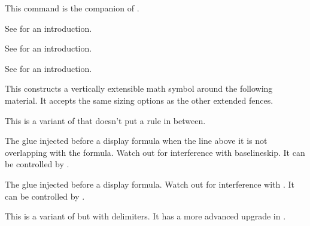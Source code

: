 \stopnewprimitive

\startnewprimitive[title={\prm {Ustopmathmode}}]

This command is the companion of .

\stopnewprimitive

\startnewprimitive[title={\prm {Ustretched}}]

See  for an introduction.

\stopnewprimitive

\startnewprimitive[title={\prm {Ustretchedwithdelims}}]

See  for an introduction.

\stopnewprimitive

\startnewprimitive[title={\prm {Uunderdelimiter}}]

See  for an introduction.

\stopnewprimitive

\startnewprimitive[title={\prm {Uvextensible}}]

This constructs a vertically extensible math symbol around the following
material. It accepts the same sizing options as the other extended fences.

\stopnewprimitive

\startoldprimitive[title={\prm {above}}][obsolete=yes]

This is a variant of  that doesn't put a rule in between.

\stopoldprimitive

\startoldprimitive[title={\prm {abovedisplayshortskip}}]

The glue injected before a display formula when the line above it is not
overlapping with the formula. Watch out for interference with \prm
{baselineskip}. It can be controlled by .

\stopoldprimitive

\startoldprimitive[title={\prm {abovedisplayskip}}]

The glue injected before a display formula. Watch out for interference with
. It can be controlled by .

\stopoldprimitive

\startoldprimitive[title={\prm {abovewithdelims}}][obsolete=yes]

This is a variant of  but with delimiters. It has a more advanced
upgrade in .

